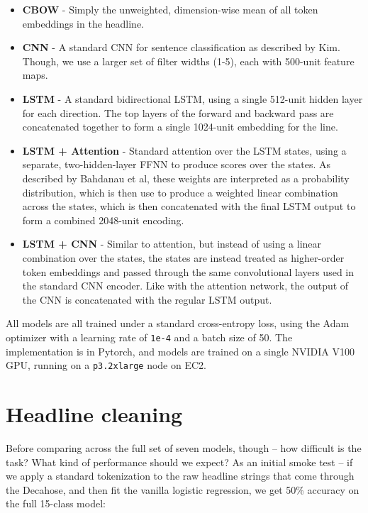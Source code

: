 \documentclass{scrartcl}
\begin{document}
\begin{itemize}
\item \textbf{CBOW} - Simply the unweighted, dimension-wise mean of all token embeddings in the headline.

\item \textbf{CNN} - A standard CNN for sentence classification as described by Kim.\cite{D14-1181} Though, we use a larger set of filter widths (1-5), each with 500-unit feature maps.

\item \textbf{LSTM} - A standard bidirectional LSTM, using a single 512-unit hidden layer for each direction. The top layers of the forward and backward pass are concatenated together to form a single 1024-unit embedding for the line.

\item \textbf{LSTM + Attention} - Standard attention over the LSTM states, using a separate, two-hidden-layer FFNN to produce scores over the states. As described by Bahdanau et al,\cite{bahdanau2014neural} these weights are interpreted as a probability distribution, which is then use to produce a weighted linear combination across the states, which is then concatenated with the final LSTM output to form a combined 2048-unit encoding.

\item \textbf{LSTM + CNN} - Similar to attention, but instead of using a linear combination over the states, the states are instead treated as higher-order token embeddings and passed through the same convolutional layers used in the standard CNN encoder. Like with the attention network, the output of the CNN is concatenated with the regular LSTM output.
\end{itemize}

All models are all trained under a standard cross-entropy loss, using the Adam optimizer with a learning rate of \texttt{1e-4} and a batch size of 50. The implementation is in Pytorch,\cite{paszke2017automatic} and models are trained on a single NVIDIA V100 GPU, running on a \texttt{p3.2xlarge} node on EC2.

\section{Headline cleaning}

Before comparing across the full set of seven models, though -- how difficult is the task? What kind of performance should we expect? As an initial smoke test -- if we apply a standard tokenization to the raw headline strings that come through the Decahose, and then fit the vanilla logistic regression, we get 50\% accuracy on the full 15-class model:
\end{document}
